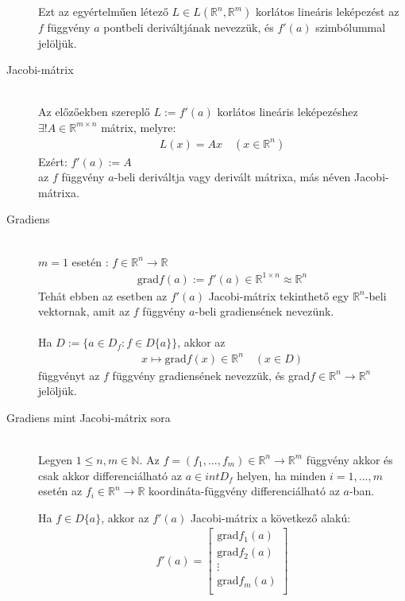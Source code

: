 \documentclass[margin=0px]{article}
\newcommand{\R}{\mathbb{R}}
\begin{document}
\begin{description}
					Ezt az egyértelműen létező $L \in L(\R^n,\R^m) $ korlátos lineáris leképezést az $f$ függvény $a$ pontbeli deriváltjának nevezzük, és $f'(a)$ szimbólummal jelöljük.
				\item[Jacobi-mátrix] \hfill \\
					Az előzőekben szereplő $L := f'(a) $ korlátos lineáris leképezéshez $ \exists!A\in\R^{m\times n}$ mátrix, melyre:
					\begin{align*}
						L(x) = Ax \quad (x\in\R^n)
					\end{align*}
					Ezért:
					$ f'(a) := A $\\
					az $f$ függvény $a$-beli deriváltja vagy derivált mátrixa, más néven Jacobi-mátrixa.
				\item[Gradiens] \hfill \\
					$m = 1$ esetén : $ f \in \R^n \rightarrow \R $
					\begin{align*}
						\textrm{grad}f(a) := f'(a) \in \R^{1\times n} \approx \R^n
					\end{align*}
					Tehát ebben az esetben az $f'(a)$ Jacobi-mátrix tekinthető egy $\R^n$-beli vektornak, amit az $f$ függvény $a$-beli gradiensének nevezünk.
					\\\\
					Ha $ D := \{a \in D_f : f \in D\{a\} \} $, akkor az
					\begin{align*}
						x \mapsto \textrm{grad}f(x) \in \R^n \quad (x \in D)
					\end{align*}
					függvényt az $f$ függvény gradiensének nevezzük, és grad$f \in \R^n \rightarrow \R^n$ jelöljük.
				\item[Gradiens mint Jacobi-mátrix sora] \hfill \\
					Legyen $1 \leq n, m \in \mathbb{N}$. Az $f = (f_1, ..., f_m) \in \R^n \rightarrow \R^m$ függvény akkor és csak akkor differenciálható az $ a \in intD_f$ helyen, ha minden $ i = 1, ..., m $ esetén az
					$f_i \in \R^n \rightarrow \R$  koordináta-függvény differenciálható az $a$-ban.
					
					Ha $f \in D\{a\}$, akkor az $f'(a)$ Jacobi-mátrix a következő alakú:
					\begin{align*}
						f'(a) = 
						\begin{bmatrix}
							\textrm{grad}f_{1}(a) \\
							\textrm{grad}f_{2}(a) \\
							\vdots \\
							\textrm{grad}f_{m}(a) \\
						\end{bmatrix}
					\end{align*}
			\end{description}
\end{document}
